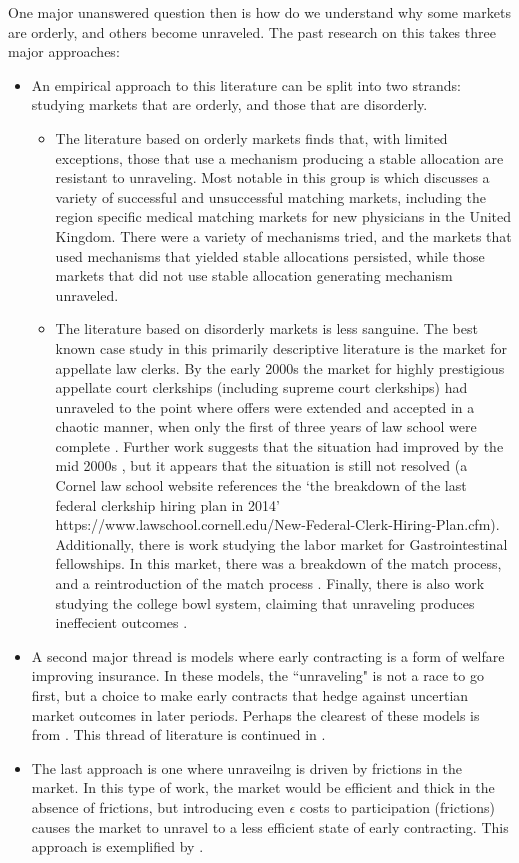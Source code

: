 \documentclass[WP]{AEA}
\begin{document}
One major unanswered question then is how do we understand why some markets are orderly, and others become unraveled.  The past research on this takes three major approaches:

\begin{itemize}
	\item An empirical approach to this literature can be split into two strands: studying markets that are orderly, and those that are disorderly. 
	\begin{itemize}
		\item The literature based on orderly markets finds that, with limited exceptions, those that use a mechanism producing a stable allocation are resistant to unraveling.  Most notable in this group is  \cite{Roth2002} which discusses a variety of successful and unsuccessful matching markets, including the region specific medical matching markets for new physicians in the United Kingdom.  There were a variety of mechanisms tried, and the markets that used mechanisms that yielded stable allocations persisted, while those markets that did not use stable allocation generating mechanism unraveled.
		\item The literature based on disorderly markets is less sanguine. The best known case study in this primarily descriptive literature is the market for appellate law clerks.  By the early 2000s the market for highly prestigious appellate court clerkships (including supreme court clerkships) had unraveled to the point where offers were extended and accepted in a chaotic manner, when only the first of three years of law school were complete \cite{Avery2001}.  Further work suggests that the situation had improved by the mid 2000s \cite{Avery2007}, but it appears that the situation is still not resolved (a Cornel law school website references the `the breakdown of the last federal clerkship hiring plan in 2014' https://www.lawschool.cornell.edu/New-Federal-Clerk-Hiring-Plan.cfm). Additionally, there is work studying the labor market for Gastrointestinal fellowships.  In this market, there was a breakdown of the match process, and a reintroduction of the match process \cite{Niederle2008,Niederle2003}.  Finally, there is also work studying the college bowl system, claiming that unraveling produces ineffecient outcomes \cite{Frechette2007}.
	\end{itemize}
	 
	\item  A second major thread is models where early contracting is a form of welfare improving insurance. In these models, the ``unraveling" is not a race to go first, but a choice to make early contracts that hedge against uncertian market outcomes in later periods.  Perhaps the clearest of these models is from \cite{Li1998}. This thread of literature is continued in \cite{Li2000,Li2004}.
	\item The last approach is one where unraveilng is driven by frictions in the market. In this type of work, the market would be efficient and thick in the absence of frictions, but introducing even $\epsilon$ costs to participation (frictions) causes the market to unravel to a less efficient state of early contracting.  This approach is exemplified by \cite{Damiano2005}.
\end{itemize}
\end{document}
